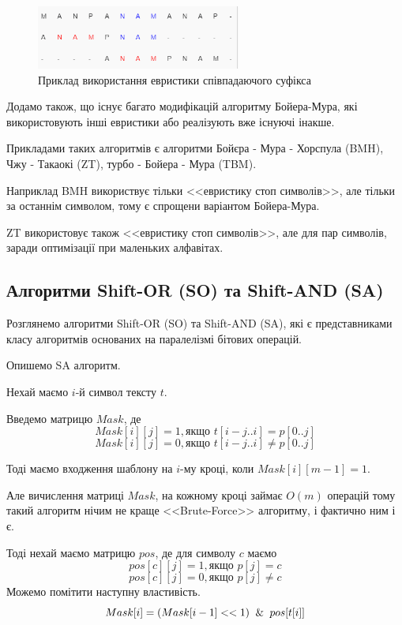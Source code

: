 \documentclass[a4paper,14pt]{extarticle} %
\begin{document}
	\begin{figure}[h] %
		\centering %
		\includegraphics[width=0.6\textwidth]{images/boyer_moore_suffix.png} %
		\caption{Приклад використання евристики співпадаючого суфікса} %
		\label{fig:boyer_moore_suffix} %
	\end{figure}

    \newpage
	Додамо також, що існує багато модифікацій алгоритму Бойера-Мура, які використовують інші евристики або реалізують вже існуючі інакше.
	
	Прикладами таких алгоритмів є алгоритми Бойєра - Мура - Хорспула (BMH), Чжу - Такаокі (ZT), турбо - Бойера - Мура (TBM).

	Наприклад BMH використвує тільки <<евристику стоп символів>>, але тільки за останнім символом, тому є спрощени варіантом Бойера-Мура.

	ZT використовує також <<евристику стоп символів>>, але для пар символів, заради оптимізації при маленьких алфавітах.

	\subsection{Алгоритми Shift-OR (SO) та Shift-AND (SA)}

	Розглянемо алгоритми Shift-OR (SO) та Shift-AND (SA), які є представниками класу алгоритмів основаних на паралелізмі бітових операцій.

	Опишемо SA алгоритм.

	Нехай маємо $i$-й символ тексту $t$. 

	Введемо матрицю $Mask$, де
	\[Mask[i][j] = 1,\text{якщо } t[i-j..i] = p[0..j]\]
	\[Mask[i][j] = 0,\text{якщо } t[i-j..i] \neq  p[0..j]\]

	Тоді маємо входження шаблону на $i$-му кроці, коли $Mask[i][m-1] = 1$.

	Але вичислення матриці $Mask$, на кожному кроці займає $O(m)$ операцій тому такий алгоритм нічим не краще <<Brute-Force>> алгоритму, і фактично ним і є.

	Тоді нехай маємо матрицю $pos$, де для символу $c$ маємо
	\[pos[c][j] = 1,\text{якщо } p[j]=c\]
	\[pos[c][j] = 0,\text{якщо } p[j] \neq c\]
	Можемо помітити наступну властивість. 
	$$Mask[i]=(Mask[i-1]<<1)\And pos[t[i]]$$
\end{document}
